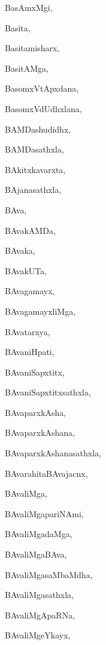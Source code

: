 \begin{multicols}{2}
{BasAmxMgi}, \pageref{BasAmxMgi}

{Basita}, \pageref{Basita}

{Basitamisharx}, \pageref{Basitamisharx}

{BasitAMga}, \pageref{BasitAMga}

{BasomxVtApxdana}, \pageref{BasomxVtApxdana}

{BasomxVdUdhxlana}, \pageref{BasomxVdUdhxlana}

{BAMDashudidhx}, \pageref{BAMDashudidhx}

{BAMDasathxla}, \pageref{BAMDasathxla}

{BAkitxkavarxta}, \pageref{BAkitxkavarxta}

{BAjanasathxla}, \pageref{BAjanasathxla}

{BAva}, \pageref{BAva}

{BAvakAMDa}, \pageref{BAvakAMDa}

{BAvaka}, \pageref{BAvaka}

{BAvakUTa}, \pageref{BAvakUTa}

{BAvagamayx}, \pageref{BAvagamayx}

{BAvagamayxliMga}, \pageref{BAvagamayxliMga}

{BAvatarxya}, \pageref{BAvatarxya}

{BAvaniHpati}, \pageref{BAvaniHpati}

{BAvaniSapxtitx}, \pageref{BAvaniSapxtitx}

{BAvaniSapxtitxsathxla}, \pageref{BAvaniSapxtitxsathxla}

{BAvaparxkAsha}, \pageref{BAvaparxkAsha}

{BAvaparxkAshana}, \pageref{BAvaparxkAshana}

{BAvaparxkAshanasathxla}, \pageref{BAvaparxkAshanasathxla}

{BAvarahitaBAvajacnx}, \pageref{BAvarahitaBAvajacnx}

{BAvaliMga}, \pageref{BAvaliMga}

{BAvaliMgapariNAmi}, \pageref{BAvaliMgapariNAmi}

{BAvaliMgadaMga}, \pageref{BAvaliMgadaMga}

{BAvaliMgaBAva}, \pageref{BAvaliMgaBAva}

{BAvaliMgasaMbaMdha}, \pageref{BAvaliMgasaMbaMdha}

{BAvaliMgasathxla}, \pageref{BAvaliMgasathxla}

{BAvaliMgApaRNa}, \pageref{BAvaliMgApaRNa}

{BAvaliMgeYkayx}, \pageref{BAvaliMgeYkayx}


\end{multicols}
